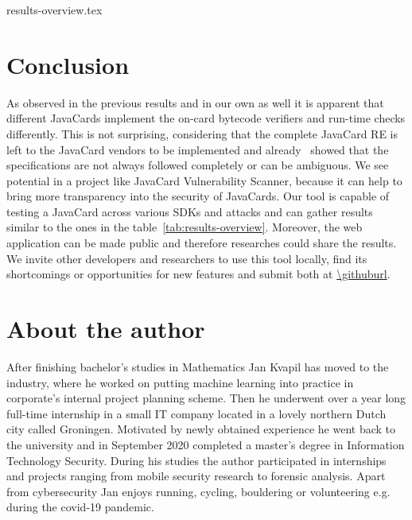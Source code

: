 \documentclass{../llncs/llncs}
\begin{document}
    {results-overview.tex}

\setlength{\tabcolsep}{\oldtabcolsep}
\renewcommand{\arraystretch}{1.2}
\setlength{\floatsep}{\oldtabcolsep}


\section{Conclusion\label{sec:conclusion}}

        As observed in the previous results and in our own as well it is apparent that different JavaCards implement the on-card bytecode verifiers and run-time checks differently. This is not surprising, considering that the complete JavaCard RE is left to the JavaCard vendors to be implemented and already~\cite{Mostowski07testingthe} showed that the specifications are not always followed completely or can be ambiguous.
        We see potential in a project like JavaCard Vulnerability Scanner, because it can help to bring more transparency into the security of JavaCards. Our tool is capable of testing a JavaCard across various SDKs and attacks and can gather results similar to the ones in the table~\ref{tab:results-overview}. Moreover, the web application can be made public and therefore researches could share the results. We invite other developers and researchers to use this tool locally, find its shortcomings or opportunities for new features and submit both at \url{\githuburl}. 

\section*{About the author}

After finishing bachelor's studies in Mathematics Jan Kvapil has moved to the industry, where he worked on putting machine learning into practice in corporate's internal project planning scheme. Then he underwent over a year long full-time internship in a small IT company located in a lovely northern Dutch city called Groningen. Motivated by newly obtained experience he went back to the university and in September 2020 completed a master's degree in Information Technology Security. During his studies the author participated in internships and projects ranging from mobile security research to forensic analysis. Apart from cybersecurity Jan enjoys running, cycling, bouldering or volunteering e.g. during the covid-19 pandemic.

\newpage


\end{document}
